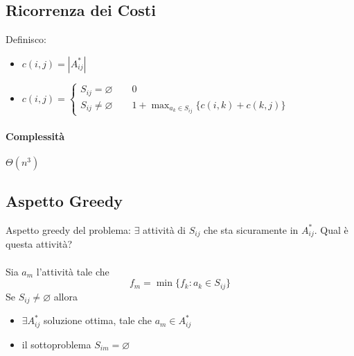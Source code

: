 \subsection{Ricorrenza dei Costi}
Definisco:
\begin{itemize}
    \item $c(i,j) = |A_{ij}^*|$
    \item $c(i,j) = \begin{cases}
        S_{ij} = \varnothing \qquad 0 \\
        S_{ij} \not= \varnothing \qquad 1 + \max_{a_k \in S_{ij}} \{c(i,k) + c(k,j)\}
    \end{cases}$
\end{itemize}
\paragraph{Complessità} $\Theta(n^3)$

\subsection{Aspetto Greedy}
Aspetto greedy del problema: $\exists$ attività di $S_{ij}$ che sta sicuramente in $A_{ij}^*$.
Qual è questa attività? \\~\\
Sia $a_m$ l'attività tale che
\begin{equation*}
    f_m = \min\{f_k: a_k \in S_{ij}\}
\end{equation*}
Se $S_{ij} \not= \varnothing$ allora
\begin{itemize}
    \item $\exists A_{ij}^*$ soluzione ottima, tale che $a_m \in A_{ij}^*$
    \item il sottoproblema $S_{im} = \varnothing$
\end{itemize}
